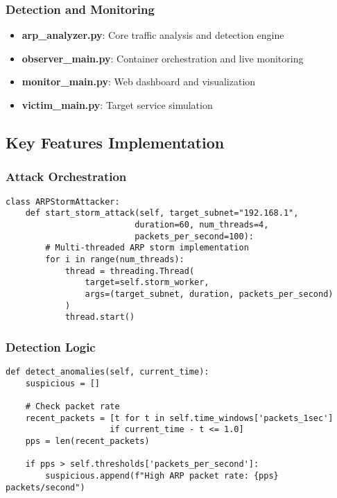 \documentclass[12pt,a4paper]{article}
\begin{document}
\subsubsection{Detection and Monitoring}
\begin{itemize}
    \item \textbf{arp\_analyzer.py}: Core traffic analysis and detection engine
    \item \textbf{observer\_main.py}: Container orchestration and live monitoring
    \item \textbf{monitor\_main.py}: Web dashboard and visualization
    \item \textbf{victim\_main.py}: Target service simulation
\end{itemize}

\subsection{Key Features Implementation}

\subsubsection{Attack Orchestration}
\begin{lstlisting}[caption=Attack Implementation Example]
class ARPStormAttacker:
    def start_storm_attack(self, target_subnet="192.168.1", 
                          duration=60, num_threads=4, 
                          packets_per_second=100):
        # Multi-threaded ARP storm implementation
        for i in range(num_threads):
            thread = threading.Thread(
                target=self.storm_worker,
                args=(target_subnet, duration, packets_per_second)
            )
            thread.start()
\end{lstlisting}

\subsubsection{Detection Logic}
\begin{lstlisting}[caption=Attack Detection Implementation]
def detect_anomalies(self, current_time):
    suspicious = []
    
    # Check packet rate
    recent_packets = [t for t in self.time_windows['packets_1sec'] 
                     if current_time - t <= 1.0]
    pps = len(recent_packets)
    
    if pps > self.thresholds['packets_per_second']:
        suspicious.append(f"High ARP packet rate: {pps} packets/second")
\end{lstlisting}
\end{document}
